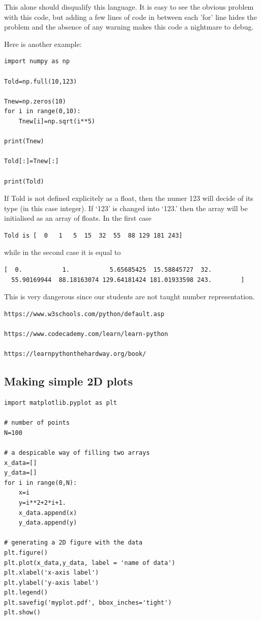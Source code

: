 This alone should disqualify this language. It is easy to see the obvious problem with this code, but adding a few lines of code in between each 'for' line hides the problem and the absence of any warning makes this code a nightmare to debug.

Here is another example:

\begin{lstlisting}
import numpy as np

Told=np.full(10,123)

Tnew=np.zeros(10)
for i in range(0,10):
    Tnew[i]=np.sqrt(i**5)

print(Tnew)

Told[:]=Tnew[:]

print(Told)
\end{lstlisting}
If Told is not defined explicitely as a float, then the 
numer 123 will decide of its type (in this case 
integer). If `123' is changed into `123.' then the 
array will be initialised as an array of floats.
In the first case 
\begin{verbatim}
Told is [  0   1   5  15  32  55  88 129 181 243]
\end{verbatim}
while in the second case it is equal to 
\begin{verbatim}
[  0.           1.           5.65685425  15.58845727  32.
  55.90169944  88.18163074 129.64181424 181.01933598 243.        ] 
\end{verbatim}
This is very dangerous since our students are not taught 
number representation.

\begin{verbatim}
https://www.w3schools.com/python/default.asp

https://www.codecademy.com/learn/learn-python

https://learnpythonthehardway.org/book/
\end{verbatim}

\subsection{Making simple 2D plots}

\begin{lstlisting}
import matplotlib.pyplot as plt

# number of points
N=100

# a despicable way of filling two arrays
x_data=[]
y_data=[]
for i in range(0,N):
    x=i
    y=i**2+2*i+1.
    x_data.append(x)
    y_data.append(y)

# generating a 2D figure with the data
plt.figure()
plt.plot(x_data,y_data, label = 'name of data')
plt.xlabel('x-axis label')
plt.ylabel('y-axis label')
plt.legend()
plt.savefig('myplot.pdf', bbox_inches='tight')
plt.show()
\end{lstlisting}

